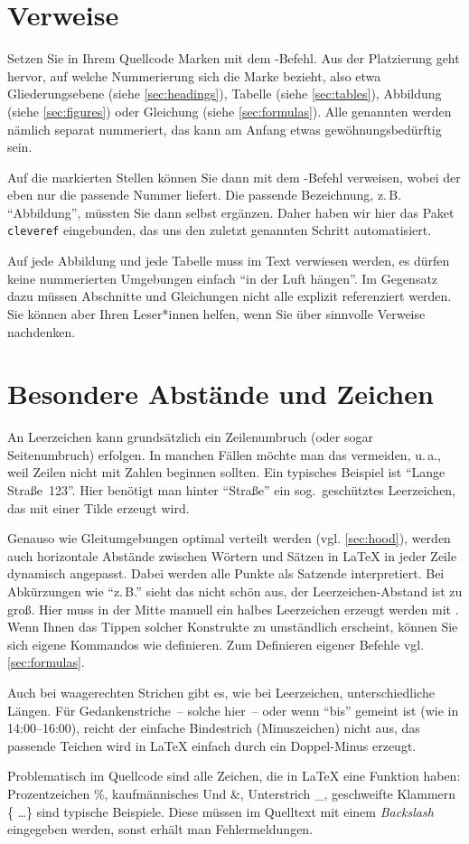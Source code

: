 \section{Verweise}
\label{sec:references}
Setzen Sie in Ihrem Quellcode Marken mit dem -Befehl. Aus der Platzierung geht hervor, auf welche Nummerierung sich die Marke bezieht, also etwa Gliederungsebene (siehe \cref{sec:headings}), Tabelle (siehe \cref{sec:tables}), Abbildung (siehe \cref{sec:figures}) oder Gleichung (siehe \cref{sec:formulas}). Alle genannten werden nämlich separat nummeriert, das kann am Anfang etwas gewöhnungsbedürftig sein.
\par
Auf die markierten Stellen können Sie dann mit dem -Befehl verweisen, wobei der eben nur die passende Nummer liefert. Die passende Bezeichnung, z.\,B. \enquote{Abbildung}, müssten Sie dann selbst ergänzen. Daher haben wir hier das Paket \texttt{cleveref} eingebunden, das uns den zuletzt genannten Schritt automatisiert.
\par
Auf jede Abbildung und jede Tabelle muss im Text verwiesen werden, es dürfen keine nummerierten Umgebungen einfach \enquote{in der Luft hängen}. Im Gegensatz dazu müssen Abschnitte und Gleichungen nicht alle explizit referenziert werden. Sie können aber Ihren Leser*innen helfen, wenn Sie über sinnvolle Verweise nachdenken.
%
%
\section{Besondere Abstände und Zeichen}
\label{sec:specialCases}
An Leerzeichen kann grundsätzlich ein Zeilenumbruch (oder sogar Seitenumbruch) erfolgen. In manchen Fällen möchte man das vermeiden, u.\,a., weil Zeilen nicht mit Zahlen beginnen sollten. Ein typisches Beispiel ist \enquote{Lange Straße~123}. Hier benötigt man hinter \enquote{Straße} ein sog.\ geschütztes Leerzeichen, das mit einer Tilde erzeugt wird.
\par
Genauso wie Gleitumgebungen optimal verteilt werden (vgl. \cref{sec:hood}), werden auch horizontale Abstände zwischen Wörtern und Sätzen in \LaTeX{} in jeder Zeile dynamisch angepasst. Dabei werden alle Punkte als Satzende interpretiert. Bei Abkürzungen wie \enquote{z.\,B.} sieht das nicht schön aus, der Leerzeichen-Abstand ist zu groß. Hier muss in der Mitte manuell ein halbes Leerzeichen erzeugt werden mit \comm{,}. Wenn Ihnen das Tippen solcher Konstrukte zu umständlich erscheint, können Sie sich eigene Kommandos wie  definieren. Zum Definieren eigener Befehle vgl. \cref{sec:formulas}.
\par
Auch bei waagerechten Strichen gibt es, wie bei Leerzeichen, unterschiedliche Längen. Für Gedankenstriche~-- solche hier~-- oder wenn \enquote{bis} gemeint ist (wie in 14:00--16:00), reicht der einfache Bindestrich (Minuszeichen) nicht aus, das passende Teichen wird in \LaTeX{} einfach durch ein Doppel-Minus erzeugt.
\par
Problematisch im Quellcode sind alle Zeichen, die in \LaTeX{} eine Funktion haben: Prozentzeichen \%, kaufmännisches Und \&, Unterstrich \_, geschweifte Klammern \{ \ldots\} sind typische Beispiele. Diese müssen im Quelltext mit einem \emph{Backslash} eingegeben werden, sonst erhält man Fehlermeldungen.
%
